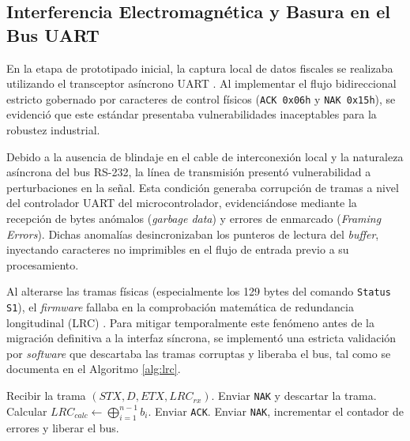 \subsection{Interferencia Electromagnética y Basura en el Bus UART}

\par En la etapa de prototipado inicial, la captura local de datos fiscales se realizaba utilizando el transceptor asíncrono UART \cite{TheFactoryHKA_Manual_Protocolos}. Al implementar el flujo bidireccional estricto gobernado por caracteres de control físicos (\texttt{ACK 0x06h} y \texttt{NAK 0x15h}), se evidenció que este estándar presentaba vulnerabilidades inaceptables para la robustez industrial.\\

\par Debido a la ausencia de blindaje en el cable de interconexión local y la naturaleza 
asíncrona del bus RS-232, la línea de transmisión presentó vulnerabilidad a perturbaciones 
en la señal. Esta condición generaba corrupción de tramas a nivel del controlador UART 
del microcontrolador, evidenciándose mediante la recepción de bytes anómalos (\textit{garbage data}) 
y errores de enmarcado (\textit{Framing Errors}). Dichas anomalías desincronizaban los punteros 
de lectura del \textit{buffer}, inyectando caracteres no imprimibles en el flujo de entrada previo a su procesamiento.\\

\par Al alterarse las tramas físicas (especialmente los 129 bytes del comando \texttt{Status S1}), el \textit{firmware} fallaba en la comprobación matemática de redundancia longitudinal (LRC) \cite{TheFactoryHKA_Manual_Protocolos}. Para mitigar temporalmente este fenómeno antes de la migración definitiva a la interfaz síncrona, se implementó una estricta validación por \textit{software} que descartaba las tramas corruptas y liberaba el bus, tal como se documenta en el Algoritmo \ref{alg:lrc}.

\begin{algorithm}[htbp]
\caption{Validación de integridad de trama e intercepción de ruido electromagnético.}
\label{alg:lrc}
\begin{algorithmic}[1]
\State Recibir la trama $(STX, D, ETX, LRC_{rx})$.
    \State Enviar \texttt{NAK} y descartar la trama.
\EndIf
\State Calcular $LRC_{calc} \leftarrow \bigoplus_{i=1}^{n-1} b_i$.
    \State Enviar \texttt{ACK}.
\Else
    \State Enviar \texttt{NAK}, incrementar el contador de errores y liberar el bus.
\EndIf
\end{algorithmic}
\end{algorithm}

